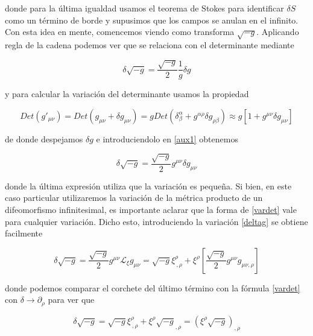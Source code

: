 \documentclass{article}
\numberwithin{equation}{section}
\begin{document}
donde para la última igualdad usamos el teorema de Stokes para identificar $ \delta S $ como un término de borde y supusimos que los campos se anulan en el infinito.\\

Con esta idea en mente, comencemos viendo como transforma $ \sqrt{-g} $. Aplicando regla de la cadena podemos ver que se relaciona con el determinante mediante

\begin{equation}\label{aux1}
\delta \sqrt{-g} = \frac{\sqrt{-g}}{2} \frac{1}{g} \delta g
\end{equation}

y para calcular la variación del determinante usamos la propiedad

\begin{equation*}
Det(g'_{\mu \nu})= Det(g_{\mu \nu} + \delta g_{\mu \nu}) = g Det\left( \delta^{\alpha}_{\beta} + g^{\alpha \rho } \delta g_{\rho \beta }\right) \approx g \left[ 1 + g^{\mu \nu} \delta g_{\mu \nu}\right]
\end{equation*}

de donde despejamos $ \delta g $ e introduciendolo en \ref{aux1} obtenemos

\begin{equation}\label{vardet}
\delta \sqrt{-g} = \frac{\sqrt{-g}}{2} g^{\mu \nu} \delta g_{\mu \nu}
\end{equation}

donde la última expresión utiliza que la variación es pequeña. Si bien, en este caso particular utilizaremos la variación de la métrica producto de un difeomorfismo infinitesimal, es importante aclarar que la forma de \ref{vardet} vale para cualquier variación. Dicho esto, introduciendo la variación \ref{deltag} se obtiene facilmente

\begin{equation*}
\delta \sqrt{-g} = \frac{\sqrt{-g}}{2} g^{\mu \nu} \mathcal{L}_{\xi} g_{\mu \nu} =  \sqrt{-g} \xi^{\rho}_{ \ ,\rho} + \xi^{\rho}\left[\frac{\sqrt{-g}}{2} g^{\mu\nu} g_{\mu \nu , \rho}\right]
\end{equation*} 

donde podemos comparar el corchete del último término con la fórmula \ref{vardet} con $ \delta \rightarrow \partial_{\rho} $ para ver que

\vspace{0.4cm}

\begin{boxquation}
	\begin{equation}\label{res1}
	\delta \sqrt{-g} = \sqrt{-g} \xi^{\rho}_{ \ ,\rho} + \xi^{\rho}\sqrt{-g}_{,\rho} = \left(\xi^{\rho} \sqrt{-g}\right)_{, \rho}
	\end{equation}
\end{boxquation}
\end{document}
